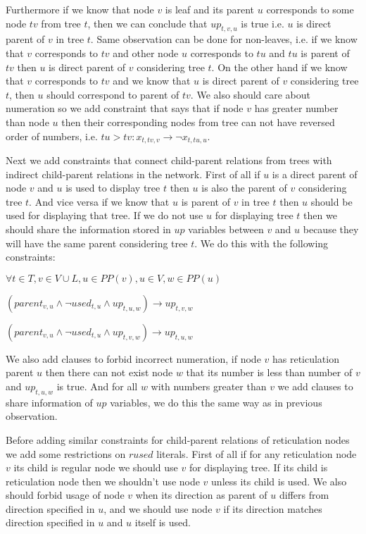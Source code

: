 \documentclass[runningheads, envcountsame, a4paper]{llncs}
\begin{document}
Furthermore if we know that node $v$ is leaf and its parent $u$ corresponds to some node $tv$ from tree $t$, 
then we can conclude that $up_{t,v,u}$ is true i.e. $u$ is direct parent of $v$ in tree $t$. Same observation 
can be done for non-leaves, i.e. if we know that $v$ corresponds to $tv$ and other node $u$ corresponds to $tu$ 
and $tu$ is parent of $tv$ then $u$ is direct parent of $v$ considering tree $t$. On the other hand if we know 
that $v$ corresponds to $tv$ and we know that $u$ is direct parent of $v$ considering tree $t$, then $u$ should 
correspond to parent of $tv$. We also should care about numeration so we add constraint that says that if node 
$v$ has greater number than node $u$ then their corresponding nodes from tree can not have reversed order of 
numbers, i.e. $tu > tv : x_{t,tv,v} \rightarrow \neg x_{t,tu,u}$.

Next we add constraints that connect child-parent relations from trees with indirect child-parent relations in 
the network. First of all if $u$ is a direct parent of node $v$ and $u$ is used to display tree $t$ then $u$ is 
also the parent of $v$ considering tree $t$. And vice versa if we know that $u$ is parent of $v$ in tree $t$ then 
$u$ should be used for displaying that tree. If we do not use $u$ for displaying tree $t$ then we should share the 
information stored in $up$ variables between $v$ and $u$ because they will have the same parent considering tree $t$. 
We do this with the following constraints:

$\forall t \in T,v \in V \cup L, u \in PP(v), u \in V, w \in PP(u)$

$(parent_{v,u} \wedge \neg used_{t,u} \wedge up_{t,u,w}) \rightarrow up_{t,v,w}$

$(parent_{v,u} \wedge \neg used_{t,u} \wedge up_{t,v,w}) \rightarrow up_{t,u,w}$

We also add clauses to forbid incorrect numeration, if node $v$ has reticulation parent $u$ then there can not 
exist node $w$ that its number is less than number of $v$ and $up_{t,u,w}$ is true. And for all $w$ with numbers 
greater than $v$ we add clauses to share information of $up$ variables, we do this the same way as in previous observation.

Before adding similar constraints for child-parent relations of reticulation nodes we add some restrictions on
$rused$ literals. First of all if for any reticulation node $v$ its child is regular node we should use $v$ for 
displaying tree. If its child is reticulation node then we shouldn't use node $v$ unless its child is used. We 
also should forbid usage of node $v$ when its direction as parent of $u$ differs from direction specified in 
$u$, and we should use node $v$ if its direction matches direction specified in $u$ and $u$ itself is used.
\end{document}
